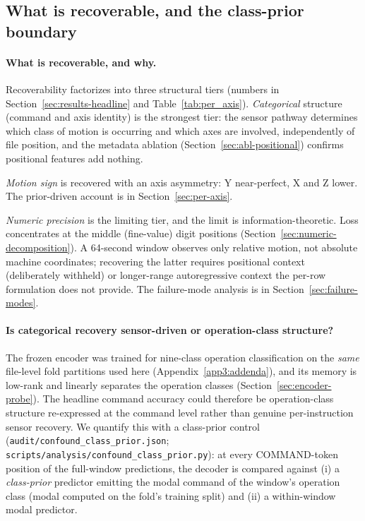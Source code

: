 \documentclass[sensors,article,submit,moreauthors,pdftex]{Definitions/mdpi}
\begin{document}
\subsection{What is recoverable, and the class-prior boundary}
\label{sec:disc-deployment}

\paragraph{What is recoverable, and why.}\label{sec:disc-recoverability}\hspace*{0pt plus 1fill}

Recoverability factorizes into three structural tiers (numbers in Section~\ref{sec:results-headline} and Table~\ref{tab:per_axis}). \emph{Categorical} structure (command and axis identity) is the strongest tier: the sensor pathway determines which class of motion is occurring and which axes are involved, independently of file position, and the metadata ablation (Section~\ref{sec:abl-positional}) confirms positional features add nothing.

\emph{Motion sign} is recovered with an axis asymmetry: Y near-perfect, X and Z lower. The prior-driven account is in Section~\ref{sec:per-axis}.

\emph{Numeric precision} is the limiting tier, and the limit is information-theoretic. Loss concentrates at the middle (fine-value) digit positions (Section~\ref{sec:numeric-decomposition}). A 64-second window observes only relative motion, not absolute machine coordinates; recovering the latter requires positional context (deliberately withheld) or longer-range autoregressive context the per-row formulation does not provide. The failure-mode analysis is in Section~\ref{sec:failure-modes}.\label{sec:disc-failure-mode}

\paragraph{Is categorical recovery sensor-driven or operation-class structure?}\label{sec:disc-confound}\hspace*{0pt plus 1fill}

The frozen encoder was trained for nine-class operation classification on the \emph{same} file-level fold partitions used here (Appendix~\ref{app3:addenda}), and its memory is low-rank and linearly separates the operation classes (Section~\ref{sec:encoder-probe}). The headline command accuracy could therefore be operation-class structure re-expressed at the command level rather than genuine per-instruction sensor recovery. We quantify this with a class-prior control (\texttt{audit/confound\_class\_prior.json}; \texttt{scripts/analysis/confound\_class\_prior.py}): at every COMMAND-token position of the full-window predictions, the decoder is compared against (i) a \emph{class-prior} predictor emitting the modal command of the window's operation class (modal computed on the fold's training split) and (ii) a within-window modal predictor.
\end{document}
